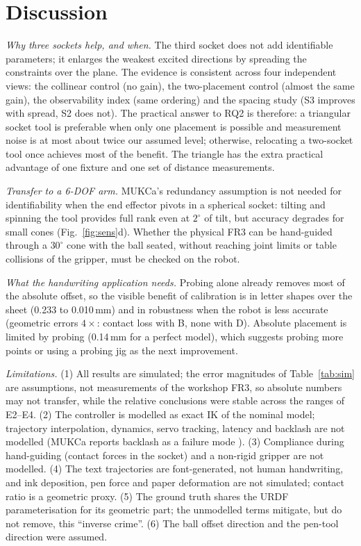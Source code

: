 \documentclass[conference]{IEEEtran}
\begin{document}
\section{Discussion}
\textit{Why three sockets help, and when.} The third socket does not add identifiable parameters; it enlarges the weakest
excited directions by spreading the constraints over the plane. The evidence is consistent across four independent views:
the collinear control (no gain), the two-placement control (almost the same gain), the observability index (same ordering)
and the spacing study (S3 improves with spread, S2 does not). The practical answer to RQ2 is therefore: a triangular socket
tool is preferable when only one placement is possible and measurement noise is at most about twice our assumed level;
otherwise, relocating a two-socket tool once achieves most of the benefit. The triangle has the extra practical advantage of
one fixture and one set of distance measurements.

\textit{Transfer to a 6-DOF arm.} MUKCa's redundancy assumption is not needed for identifiability when the end effector
pivots in a spherical socket: tilting and spinning the tool provides full rank even at $2^\circ$ of tilt, but accuracy
degrades for small cones (Fig.~\ref{fig:sens}d). Whether the physical FR3 can be hand-guided through a $30^\circ$ cone with the
ball seated, without reaching joint limits or table collisions of the gripper, must be checked on the robot.

\textit{What the handwriting application needs.} Probing alone already removes most of the absolute offset, so the visible
benefit of calibration is in letter shapes over the sheet (0.233 to 0.010\,mm) and in robustness when the robot is less
accurate (geometric errors $4\times$: contact loss with B, none with D). Absolute placement is limited by probing
(0.14\,mm for a perfect model), which suggests probing more points or using a probing jig as the next improvement.

\textit{Limitations.} (1) All results are simulated; the error magnitudes of Table~\ref{tab:sim} are assumptions, not
measurements of the workshop FR3, so absolute numbers may not transfer, while the relative conclusions were stable across
the ranges of E2--E4. (2) The controller is modelled as exact IK of the nominal model; trajectory interpolation, dynamics,
servo tracking, latency and backlash are not modelled (MUKCa reports backlash as a failure mode \cite{franzese2026mukca}).
(3) Compliance during hand-guiding (contact forces in the socket) and a non-rigid gripper are not modelled. (4) The text
trajectories are font-generated, not human handwriting, and ink deposition, pen force and paper deformation are not
simulated; contact ratio is a geometric proxy. (5) The ground truth shares the URDF parameterisation for its geometric part;
the unmodelled terms mitigate, but do not remove, this ``inverse crime''. (6) The ball offset direction and the pen-tool
direction were assumed.
\end{document}
